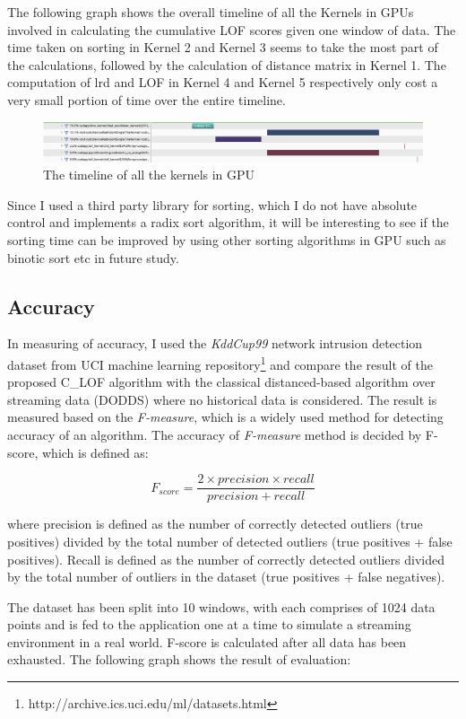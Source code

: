 \documentclass[11pt]{article}       %
\begin{document}
The following graph shows the overall timeline of all the Kernels in GPUs involved in calculating the cumulative LOF scores given one window of data. The time taken on sorting in Kernel 2 and Kernel 3 seems to take the most part of the calculations, followed by the calculation of distance matrix in Kernel 1. The computation of lrd and LOF in Kernel 4 and Kernel 5 respectively only cost a very small portion of time over the entire timeline. 

\begin{figure}[h!]
\centering
\includegraphics[width=15cm]{Figures/timeline}
\caption{The timeline of all the kernels in GPU}
\label{fig:timeline}
\end{figure}

Since I used a third party library for sorting, which I do not have absolute control and implements a radix sort algorithm, it will be interesting to see if the sorting time can be improved by using other sorting algorithms in GPU such as binotic sort etc in future study.

\subsection{Accuracy}

In measuring of accuracy, I used the \textit{KddCup99} network intrusion detection dataset from UCI machine learning repository\footnote{http://archive.ics.uci.edu/ml/datasets.html} and compare the result of the proposed C\_LOF algorithm with the classical distanced-based algorithm over streaming data (DODDS) where no historical data is considered. The result is measured based on the \textit{F-measure}, which is a widely used method for detecting accuracy of an algorithm. The accuracy of \textit{F-measure} method is decided by F-score, which is defined as:

\[ F_{score} = \frac{2 \times precision \times recall}{precision + recall}  \]

where precision is defined as the number of correctly detected outliers (true positives) divided by the total number of detected outliers (true positives + false positives). Recall is defined as the number of correctly detected outliers divided by the total number of outliers in the dataset (true positives + false negatives). 

The dataset has been split into 10 windows, with each comprises of 1024 data points and is fed to the application one at a time to simulate a streaming environment in a real world. F-score is calculated after all data has been exhausted. The following graph shows the result of evaluation:
\end{document}
